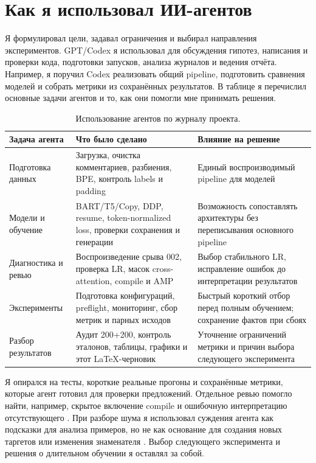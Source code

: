 \section{Как я использовал ИИ-агентов}
Я формулировал цели, задавал ограничения и выбирал направления
экспериментов. GPT/Codex я использовал для обсуждения гипотез,
написания и проверки кода, подготовки запусков, анализа журналов
и ведения отчёта. Например, я поручил Codex реализовать общий pipeline,
подготовить сравнения моделей и собрать метрики из сохранённых результатов.
В таблице я перечислил основные задачи агентов и то, как они помогли
мне принимать решения.

\begin{table}[htbp]
\centering\small
\begin{tabularx}{\linewidth}{>{\raggedright\arraybackslash}p{.20\linewidth}YY}
\toprule
Задача агента & Что было сделано & Влияние на решение \\
\midrule
Подготовка данных & Загрузка, очистка комментариев, разбиения, BPE,
контроль labels и padding & Единый воспроизводимый pipeline для моделей \\
Модели и обучение & BART/T5/Copy, DDP, resume, token-normalized loss,
проверки сохранения и генерации & Возможность сопоставлять архитектуры
без переписывания основного pipeline \\
Диагностика и ревью & Воспроизведение срыва 002, проверка LR,
масок cross-attention, compile и AMP & Выбор стабильного LR,
исправление ошибок до интерпретации результатов \\
Эксперименты & Подготовка конфигураций, preflight, мониторинг,
сбор метрик и парных исходов & Быстрый короткий отбор перед полным
обучением; сохранение фактов при сбоях \\
Разбор результатов & Аудит 200+200, контроль эталонов,
таблицы, графики и этот LaTeX-черновик & Уточнение ограничений метрики
и причин выбора следующего эксперимента \\
\bottomrule
\end{tabularx}
\caption{Использование агентов по журналу проекта.}
\end{table}

Я опирался на тесты, короткие реальные прогоны и сохранённые метрики,
которые агент готовил для проверки предложений. Отдельное ревью помогло
найти, например, скрытое включение compile и ошибочную интерпретацию
отсутствующего . При разборе шума я использовал
суждения агента как подсказки для анализа примеров, но не как основание
для создания новых таргетов или изменения знаменателя \pass{}.
Выбор следующего эксперимента и решения о длительном обучении
я оставлял за собой.

